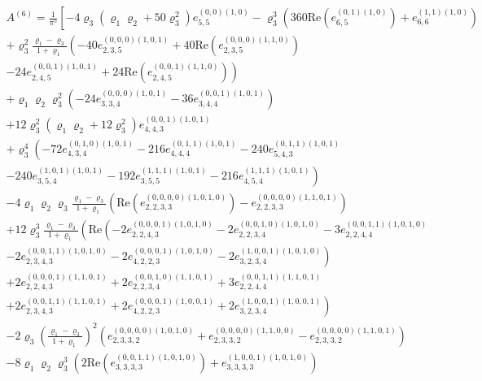 \documentclass[12pt,a4paper,twoside,openright]{report}
\theoremstyle{definition}
\theoremstyle{remark}
\begin{document}
\begin{multline}\label{eq:A6}
A^{(6)} =
\frac{1}{ \pi^5}  \left[
-4\varrho_3(\varrho_1\varrho_2+50\varrho_3^2) e_{5,5}^{(0,0)(1,0)}
- \varrho_3^3 \left(360\mathrm{Re}\left(e_{6,5}^{(0,1)(1,0)}\right)
+e_{6,6}^{(1,1)(1,0)}\right)
\right. \\
+\varrho_3^2\frac{\varrho_1-\varrho_3}{1+\varrho_1}\left(
-40 e_{2,3,5}^{(0,0,0)(1,0,1)}
+40\mathrm{Re} \left(e_{2,3,5}^{(0,0,0)(1,1,0)}\right)
\right. \\ \left.
-24 e_{2,4,5}^{(0,0,1)(1,0,1)}
+ 24\mathrm{Re}\left(e_{2,4,5}^{(0,0,1)(1,1,0)}\right)
\right)
\\
+\varrho_1\varrho_2\varrho_3^2\left(
-24e_{3,3,4}^{(0,0,0)(1,0,1)}
-36e_{3,4,4}^{(0,0,1)(1,0,1)}
\right)
\\
+12\varrho_3^2(\varrho_1\varrho_2+12\varrho_3^2)
e_{4,4,3}^{(0,0,1)(1,0,1)}
\\
+\varrho_3^4\left(-72 e_{4,3,4}^{(0,1,0)(1,0,1)}
-  216 e_{4,4,4}^{(0,1,1)(1,0,1)}
-240 e_{5,4,3}^{(0,1,1)(1,0,1)}\right. \\ \left.
-240 e_{3,5,4}^{(1,0,1)(1,0,1)}
-192 e_{3,5,5}^{(1,1,1)(1,0,1)}
- 216 e_{4,5,4}^{(1,1,1)(1,0,1)}
\right)
\\
-4\varrho_1\varrho_2\varrho_3\frac{\varrho_1-\varrho_3}{1+\varrho_1}
\left(\mathrm{Re}\left( e_{2,2,3,3}^{(0,0,0,0)(1,0,1,0)}\right) -e_{2,2,3,3}^{(0,0,0,0)(1,1,0,1)}
\right)
\\
+12\varrho_3^3\frac{\varrho_1-\varrho_3}{1+\varrho_1}\left(
\mathrm{Re}\left( -2e_{2,2,4,3}^{(0,0,0,1)(1,0,1,0)}
-2 e_{2,2,3,4}^{(0,0,1,0)(1,0,1,0)}
-3 e_{2,2,4,4}^{(0,0,1,1)(1,0,1,0)}
\right.\right.\\ \left.
 -2e_{2,3,4,3}^{(0,0,1,1)(1,0,1,0)}
-2e_{4,2,2,3}^{(0,0,0,1)(1,0,1,0)}
-2e_{3,2,3,4}^{(1,0,0,1)(1,0,1,0)}\right)
 \\ 	\left.
+2 e_{2,2,4,3}^{(0,0,0,1)(1,1,0,1)}
+2 e_{2,2,3,4}^{(0,0,1,0)(1,1,0,1)}
+3e_{2,2,4,4}^{(0,0,1,1)(1,1,0,1)} \right. \\ \left.
+2 e_{2,3,4,3}^{(0,0,1,1)(1,1,0,1)}
+2e_{4,2,2,3}^{(0,0,0,1)(1,0,0,1)}
+2e_{3,2,3,4}^{(1,0,0,1)(1,0,0,1)}
\right)
\\
-2\varrho_3\left(\frac{\varrho_1-\varrho_3}{1+\varrho_1}\right)^2
\left(
e_{2,3,3,2}^{(0,0,0,0)(1,0,1,0)}
+e_{2,3,3,2}^{(0,0,0,0)(1,1,0,0)}
-e_{2,3,3,2}^{(0,0,0,0)(1,1,0,1)}
\right)
\\
-8\varrho_1\varrho_2\varrho_3^3\left(
2\mathrm{Re}\left(e_{3,3,3,3}^{(0,0,1,1)(1,0,1,0)}\right)
+e_{3,3,3,3}^{(1,0,0,1)(1,0,1,0)}
\right)
\\

\end{multline}
\end{document}
